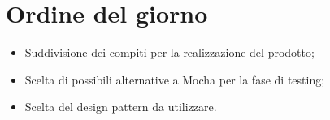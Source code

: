 \section{Ordine del giorno}
\begin{itemize}
\item Suddivisione dei compiti per la realizzazione del prodotto;
\item Scelta di possibili alternative a Mocha per la fase di testing;
\item Scelta del design pattern da utilizzare.
\end{itemize}